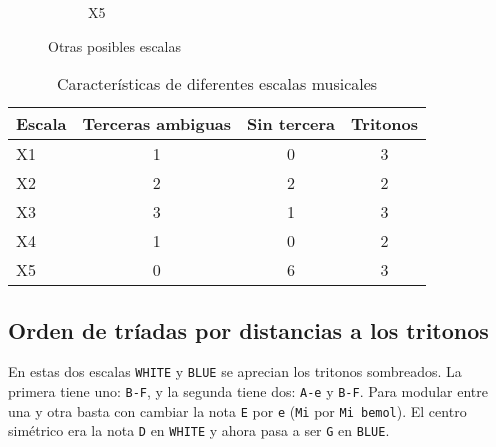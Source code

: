 \documentclass[]{report}
\begin{document}
\begin{figure}[H]
\begin{subfigure}{0.15\textwidth}
  \end{subfigure}
  \hfill
  \begin{subfigure}{0.15\textwidth}
    \centering
    \caption{\textsf{X5}}
    
  \end{subfigure}
  \hfill
  \caption{Otras posibles escalas}\label{fig:more-posible-scales}
\end{figure}

\begin{table}[H]
  \centering
  \begin{tabular}{lccc}
    \toprule
    Escala & Terceras ambiguas & Sin tercera & Tritonos \\
    \midrule
    X1 & 1 & 0 & 3 \\
    X2 & 2 & 2 & 2 \\
    X3 & 3 & 1 & 3 \\
    X4 & 1 & 0 & 2 \\
    X5 & 0 & 6 & 3 \\
    \bottomrule
  \end{tabular}
  \caption{Características de diferentes escalas musicales}\label{tab:escalas}
\end{table}

\subsection{Orden de tríadas por distancias a los tritonos}

En estas dos escalas \texttt{WHITE} y \texttt{BLUE} se aprecian los tritonos sombreados. La primera tiene uno: \texttt{B-F}, y la segunda tiene dos: \texttt{A-e} y \texttt{B-F}. Para modular entre una y otra basta con cambiar la nota \texttt{E} por \texttt{e} (\texttt{Mi} por \texttt{Mi\ bemol}). El centro simétrico era la nota \texttt{D} en \texttt{WHITE} y ahora pasa a ser \texttt{G} en \texttt{BLUE}. 
\end{document}
